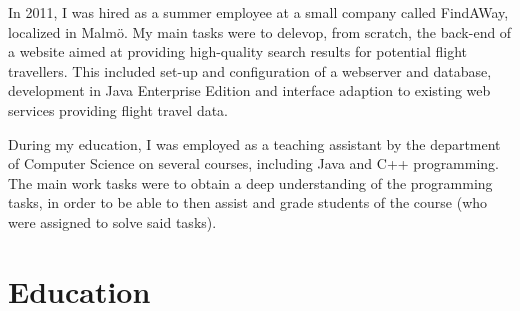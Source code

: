 \documentclass[a4paper]{article}
\begin{document}
In 2011, I was hired as a summer employee at a small company called FindAWay, localized in Malmö. My main tasks were to delevop, from scratch, the back-end of a website aimed at providing high-quality search results for potential flight travellers. This included set-up and configuration of a webserver and database, development in Java Enterprise Edition and interface adaption to existing web services providing flight travel data.

During my education, I was employed as a teaching assistant by the department of Computer Science on several courses, including Java and C++ programming. The main work tasks were to obtain a deep understanding of the programming tasks, in order to be able to then assist and grade students of the course (who were assigned to solve said tasks).

\section*{Education}
\end{document}
